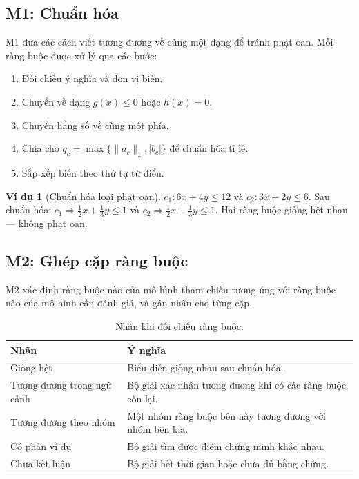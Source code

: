 \documentclass[11pt,a4paper]{article}
\theoremstyle{plain}
\theoremstyle{definition}
\newtheorem{example}[theorem]{Ví dụ}
\theoremstyle{remark}
\begin{document}
\subsection{M1: Chuẩn hóa}

M1 đưa các cách viết tương đương về cùng một dạng để tránh phạt oan.
Mỗi ràng buộc được xử lý qua các bước:
\begin{enumerate}
  \item Đối chiếu ý nghĩa và đơn vị biến.
  \item Chuyển về dạng $g(x) \leq 0$ hoặc $h(x) = 0$.
  \item Chuyển hằng số về cùng một phía.
  \item Chia cho $q_c = \max\{\|a_c\|_1, |b_c|\}$ để chuẩn hóa tỉ lệ.
  \item Sắp xếp biến theo thứ tự từ điển.
\end{enumerate}

\begin{example}[Chuẩn hóa loại phạt oan]
$c_1: 6x + 4y \leq 12$ và $c_2: 3x + 2y \leq 6$.
Sau chuẩn hóa: $c_1 \Rightarrow \tfrac{1}{2}x + \tfrac{1}{3}y \leq 1$
và $c_2 \Rightarrow \tfrac{1}{2}x + \tfrac{1}{3}y \leq 1$.
Hai ràng buộc giống hệt nhau --- không phạt oan.
\end{example}

\subsection{M2: Ghép cặp ràng buộc}

M2 xác định ràng buộc nào của mô hình tham chiếu tương ứng với ràng buộc nào
của mô hình cần đánh giá, và gán nhãn cho từng cặp.

\begin{table}[H]
\centering
\caption{Nhãn khi đối chiếu ràng buộc.}
\label{tab:labels}
\small
\begin{tabularx}{\textwidth}{L{4.5cm} Y}
\toprule
\textbf{Nhãn} & \textbf{Ý nghĩa} \\
\midrule
Giống hệt & Biểu diễn giống nhau sau chuẩn hóa. \\
Tương đương trong ngữ cảnh & Bộ giải xác nhận tương đương khi có các ràng buộc còn lại. \\
Tương đương theo nhóm & Một nhóm ràng buộc bên này tương đương với nhóm bên kia. \\
Có phản ví dụ & Bộ giải tìm được điểm chứng minh khác nhau. \\
Chưa kết luận & Bộ giải hết thời gian hoặc chưa đủ bằng chứng. \\
\bottomrule
\end{tabularx}
\end{table}
\end{document}
